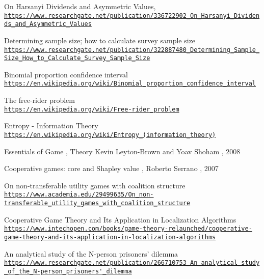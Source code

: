 \documentclass{article}
\begin{document}
  


\clearpage
\begin{thebibliography}

On Harsanyi Dividends and Asymmetric Values,
\\\texttt{\url{https://www.researchgate.net/publication/336722902_On_Harsanyi_Dividends_and_Asymmetric_Values}}

\hypertarget{2}{}
Determining sample size; how to calculate survey sample size
\\\texttt{\url{https://www.researchgate.net/publication/322887480_Determining_Sample_Size_How_to_Calculate_Survey_Sample_Size}}

Binomial proportion confidence interval
\\\texttt{\url{https://en.wikipedia.org/wiki/Binomial_proportion_confidence_interval}}

The free-rider problem
\\\texttt{\url{https://en.wikipedia.org/wiki/Free-rider_problem}}

Entropy - Information Theory
\\\texttt{\url{https://en.wikipedia.org/wiki/Entropy_(information_theory)}}

Essentials of Game , Theory Kevin Leyton-Brown and Yoav Shoham , 2008

Cooperative games: core and Shapley value , Roberto Serrano , 2007

On non-transferable utility games with coalition structure
\\\texttt{\url{https://www.academia.edu/29499635/On_non-transferable_utility_games_with_coalition_structure}}

Cooperative Game Theory and Its Application in Localization Algorithms
\\\texttt{\url{https://www.intechopen.com/books/game-theory-relaunched/cooperative-game-theory-and-its-application-in-localization-algorithms}}

An analytical study of the N-person prisoners’ dilemma
\\\texttt{\url{https://www.researchgate.net/publication/266710753_An_analytical_study_of_the_N-person_prisoners'_dilemma}}

\end{thebibliography}
\end{document}
